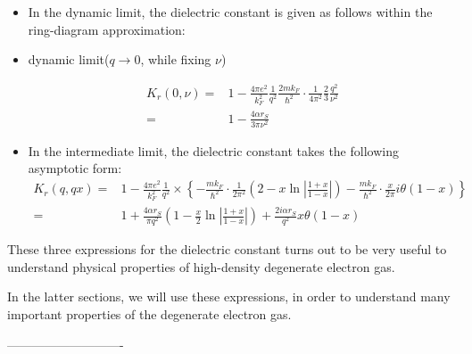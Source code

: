 \begin{itemize}
In terms of $r_S$, the dielectric constant in the static limit is given by
\begin{equation} \label{Eqs2.8.33}
K_r(q,0) = 1+ \frac{2\alpha r_S}{\pi q^2}\left[ 1-\frac{1}{q}(1-\frac{q^2}{4})ln\left| \frac{1-\frac{q}{2}}{1+\frac{q}{2}} \right| \right]
\end{equation}

\item In the dynamic limit, the dielectric constant is given as follows within the ring-diagram approximation:
\item \begin{center}dynamic limit($q \rightarrow 0$, while fixing $\nu$)\end{center}
\begin{equation} \label{Eqs2.8.34} \begin{split}
K_r(0,\nu) =& 1- \frac{4\pi e^2}{k_F^2} \frac{1}{q^2}\frac{2 m k_F}{\hbar^2} \cdot \frac{1}{4\pi^2} \frac{2}{3}\frac{q^2}{\nu^2}\\
=& 1- \frac{4\alpha r_S}{3\pi \nu^2}
\end{split}\end{equation}

\item In the intermediate limit, the dielectric constant takes the following  asymptotic form:
\begin{equation} \label{Eqs2.8.35} \begin{split}
K_r(q,qx) =& 1-\frac{4\pi e^2}{k_F^2}\frac{1}{q^2} \times \left\{ - \frac{m k_F}{\hbar^2}\cdot\frac{1}{2\pi^2}\left( 2-x \ln\left| \frac{1+x}{1-x} \right| \right) - \frac{m k_F}{\hbar^2}\cdot \frac{x}{2\pi} i \theta(1-x) \right\}\\
=& 1+ \frac{4 \alpha r_S}{\pi q^2}\left( 1-\frac{x}{2} \ln\left| \frac{1+x}{1-x} \right|  \right) + \frac{2 i \alpha r_S}{q^2} x \theta(1-x)
\end{split}\end{equation}

\end{itemize}

These three expressions for the dielectric constant turns out to be very useful to understand physical properties of high-density degenerate electron gas.

In the latter sections, we will use these expressions, in order to understand many important properties of the degenerate electron gas.
\begin{center}----------------------------\end{center}

